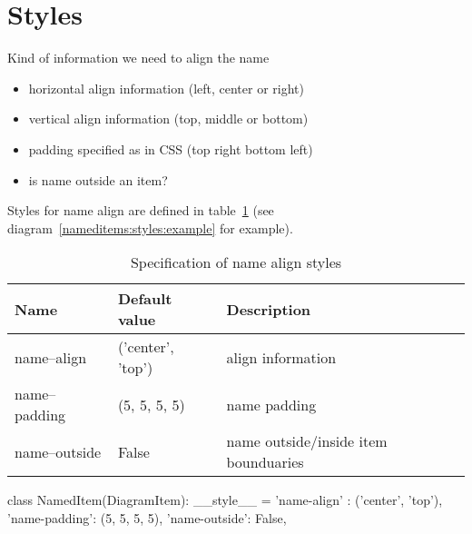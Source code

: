 \documentclass{book}
\begin{document}

\section{Styles}
Kind of information we need to align the name
\begin{itemize}
\item horizontal align information (left, center or right)
\item vertical align information (top, middle or bottom)
\item padding specified as in CSS (top right bottom left)
\item is name outside an item?
\end{itemize}

Styles for name align are defined in table~\ref{nameditems:styles:spec}
(see diagram~\ref{nameditems:styles:example} for example).

\begin{table}
\begin{center}
\begin{tabular}{|l|l|l|}
\hline
Name           & Default value     & Description \\
\hline
name--align    & ('center', 'top') & align information \\
name--padding  & (5, 5, 5, 5)      & name padding \\
name--outside  & False             & name outside/inside item bounduaries \\
\hline
\end{tabular}
\caption{Specification of name align styles}\label{nameditems:styles:spec}
\end{center}
\end{table}


\begin{code}
\begin{pylst}
class NamedItem(DiagramItem):
    __style__ = {
        'name-align' : ('center', 'top'),
        'name-padding': (5, 5, 5, 5),
        'name-outside': False,
    }
\end{pylst}
\caption{Named items style example}\label{nameditems:styles:example}
\end{code}
\end{document}

